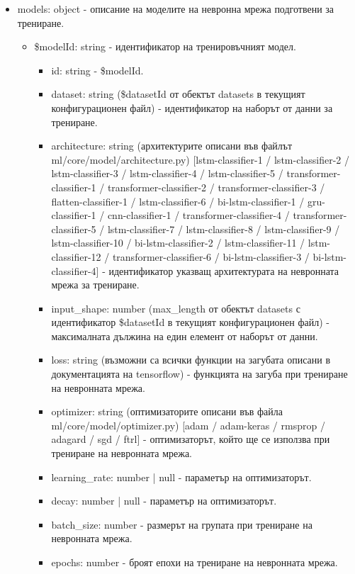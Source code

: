 \documentclass{article}
\begin{document}
\begin{itemize}
\begin{itemize}
\begin{itemize}
            \end{itemize}

        \end{itemize}

        \item models: object - описание на моделите на невронна мрежа подготвени за трениране.

        \begin{itemize}

            \item \$modelId: string - идентификатор на тренировъчният модел.

            \begin{itemize}

                \item id: string - \$modelId.
                \item dataset: string (\$datasetId от обектът datasets в текущият конфигурационен файл) - идентификатор на
                наборът от данни за трениране.
                \item architecture: string (архитектурите описани във файлът ml/core/model/architecture.py)
                [lstm-classifier-1 / lstm-classifier-2 / lstm-classifier-3 / lstm-classifier-4 / lstm-classifier-5 /
                transformer-classifier-1 / transformer-classifier-2 / transformer-classifier-3 / flatten-classifier-1 /
                lstm-classifier-6 / bi-lstm-classifier-1 / gru-classifier-1 / cnn-classifier-1 / transformer-classifier-4 /
                transformer-classifier-5 / lstm-classifier-7 / lstm-classifier-8 / lstm-classifier-9 / lstm-classifier-10 /
                bi-lstm-classifier-2 / lstm-classifier-11 / lstm-classifier-12 / transformer-classifier-6 /
                bi-lstm-classifier-3 / bi-lstm-classifier-4] - идентификатор указващ архитектурата на невронната мрежа за
                трениране.
                \item input\_shape: number (max\_length от обектът datasets с идентификатор \$datasetId в текущият
                конфигурационен файл) - максималната дължина на един елемент от наборът от данни.
                \item loss: string (възможни са всички функции на загубата описани в документацията на tensorflow) -
                функцията на загуба при трениране на невронната мрежа.
                \item optimizer: string (оптимизаторите описани във файла ml/core/model/optimizer.py) [adam / adam-keras /
                rmsprop / adagard / sgd / ftrl] - оптимизаторът, който ще се използва при трениране на невронната мрежа.
                \item learning\_rate: number | null - параметър на оптимизаторът.
                \item decay: number | null - параметър на оптимизаторът.
                \item batch\_size: number - размерът на групата при трениране на невронната мрежа.
                \item epochs: number - броят епохи на трениране на невронната мрежа.


\end{itemize}
\end{itemize}
\end{itemize}
\end{document}
